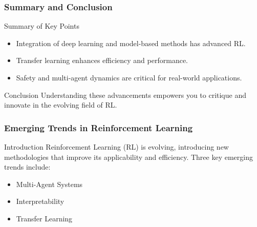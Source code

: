 \documentclass{beamer}
\begin{document}
\begin{frame}[fragile]
    \frametitle{Summary and Conclusion}
    \begin{block}{Summary of Key Points}
        \begin{itemize}
            \item Integration of deep learning and model-based methods has advanced RL.
            \item Transfer learning enhances efficiency and performance.
            \item Safety and multi-agent dynamics are critical for real-world applications.
        \end{itemize}
    \end{block}

    \begin{block}{Conclusion}
        Understanding these advancements empowers you to critique and innovate in the evolving field of RL.
    \end{block}
\end{frame}

\begin{frame}[fragile]
    \frametitle{Emerging Trends in Reinforcement Learning}
    
    \begin{block}{Introduction}
        Reinforcement Learning (RL) is evolving, introducing new methodologies that improve its applicability and efficiency. Three key emerging trends include:
        \begin{itemize}
            \item Multi-Agent Systems
            \item Interpretability
            \item Transfer Learning
        \end{itemize}
    \end{block}
\end{frame}
\end{document}

